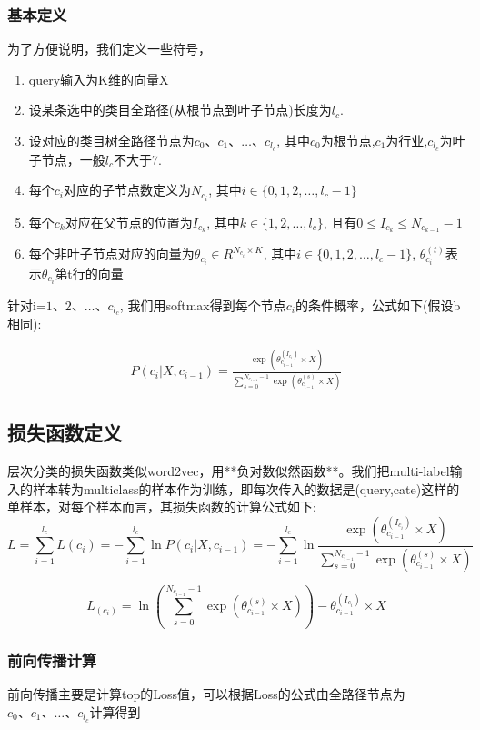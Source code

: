 \subsubsection{基本定义}
为了方便说明，我们定义一些符号，
\begin{enumerate}
\item query输入为K维的向量X
\item 设某条选中的类目全路径(从根节点到叶子节点)长度为$l_{c}$.
\item 设对应的类目树全路径节点为$c_{0}、c_{1}、\dots、c_{l_{c}}$, 其中$c_{0}$为根节点,$c_{1}$为行业,$c_{l_{c}}$为叶子节点，一般$l_{c}$不大于7.
\item 每个$c_{i}$对应的子节点数定义为$N_{c_{i}}$, 其中$i \in \{0,1,2,\dots,l_{c}-1\}$
\item 每个$c_{k}$对应在父节点的位置为$I_{c_{k}}$, 其中$k \in \{1,2,\dots,l_{c}\}$, 且有$0\leq I_{c_{k}} \leq N_{c_{k-1}}-1$
\item 每个非叶子节点对应的向量为$\theta_{c_i}\in R^{N_{c_{i}}\times K}$, 其中$i \in \{0,1,2,\dots,l_{c}-1\}$, $\theta_{c_{i}}^{(t)}$表示$\theta_{c_{i}}$第t行的向量
\end{enumerate}
\par 针对i=$1、2、\dots、c_{l_{c}}$, 我们用softmax得到每个节点$c_{i}$的条件概率，公式如下(假设b相同):

\begin{align}
P(c_{i}|X,c_{i-1}) = \frac{\exp(\theta_{c_{i-1}}^{(I_{c_{i}})}\times X)} {\sum_{s=0}^{N_{c_{i-1}}-1} \exp(\theta_{c_{i-1}}^{(s)} \times X)}
\end{align}

\subsection{损失函数定义}
层次分类的损失函数类似word2vec，用**负对数似然函数**。我们把multi-label输入的样本转为multiclass的样本作为训练，即每次传入的数据是(query,cate)这样的单样本，对每个样本而言，其损失函数的计算公式如下:
$$L=\sum_{i=1}^{l_{c}}L(c_{i})=-\sum_{i=1}^{l_{c}} \ln P(c_{i}|X,c_{i-1})=-\sum_{i=1}^{l_{c}}\ln\frac{\exp(\theta_{c_{i-1}}^{(I_{c_{i}})}\times X)} {\sum_{s=0}^{N_{c_{i-1}}-1} \exp(\theta_{c_{i-1}}^{(s)} \times X)}$$

$$L_(c_{i}) = \ln (\sum_{s=0}^{N_{c_{i-1}}-1}\exp(\theta_{c_{i-1}}^{(s)} \times X))- \theta_{c_{i-1}}^{(I_{c_{i}})}\times X$$

\subsubsection{前向传播计算}
前向传播主要是计算top的Loss值，可以根据Loss的公式由全路径节点为$c_{0}、c_{1}、\dots、c_{l_{c}}$计算得到
